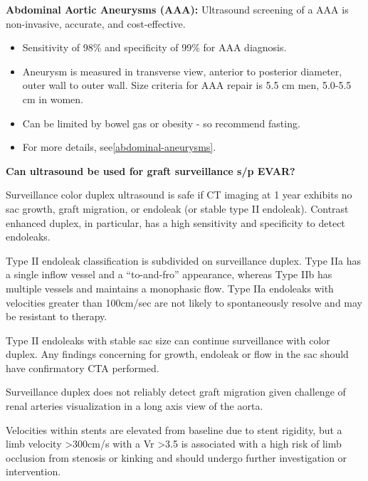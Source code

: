 \documentclass[
]{book}
\begin{document}
\textbf{Abdominal Aortic Aneurysms (AAA):} Ultrasound screening of a AAA is
non-invasive, accurate, and cost-effective.\citep{chaikof2018}

\begin{itemize}
\item
  Sensitivity of 98\% and specificity of 99\% for AAA
  diagnosis.\citep{wilmink2002}
\item
  Aneurysm is measured in transverse view, anterior to posterior
  diameter, outer wall to outer wall.\citep{iac2021} Size criteria for AAA
  repair is 5.5 cm men, 5.0-5.5 cm in women.
\item
  Can be limited by bowel gas or obesity - so recommend fasting.
\item
  For more details, see\ref{abdominal-aneurysms}.
\end{itemize}

\textbf{Can ultrasound be used for graft surveillance s/p EVAR?}

Surveillance color duplex ultrasound is safe if CT imaging at 1 year
exhibits no sac growth, graft migration, or endoleak (or stable type II
endoleak). Contrast enhanced duplex, in particular, has a high
sensitivity and specificity to detect endoleaks.\citep{abraha2017, kapetanios2019, chaer2009}

Type II endoleak classification is subdivided on surveillance duplex.
Type IIa has a single inflow vessel and a ``to-and-fro'' appearance,
whereas Type IIb has multiple vessels and maintains a monophasic flow.
Type IIa endoleaks with velocities greater than 100cm/sec are not likely
to spontaneously resolve and may be resistant to therapy.\citep{arko2003, vanmarrewijk2004}

Type II endoleaks with stable sac size can continue surveillance with
color duplex.\citep{chaikof2018, karthikesalingam2012, chaer2009} Any
findings concerning for growth, endoleak or flow in the sac should have
confirmatory CTA performed.\citep{maleux2017}

Surveillance duplex does not reliably detect graft migration given
challenge of renal arteries visualization in a long axis view of the
aorta.\citep{busch2009}

Velocities within stents are elevated from baseline due to stent
rigidity, but a limb velocity \textgreater300cm/s with a Vr \textgreater3.5 is associated
with a high risk of limb occlusion from stenosis or kinking and should
undergo further investigation or intervention.\citep{chaikof2018, blom2012}
\end{document}
